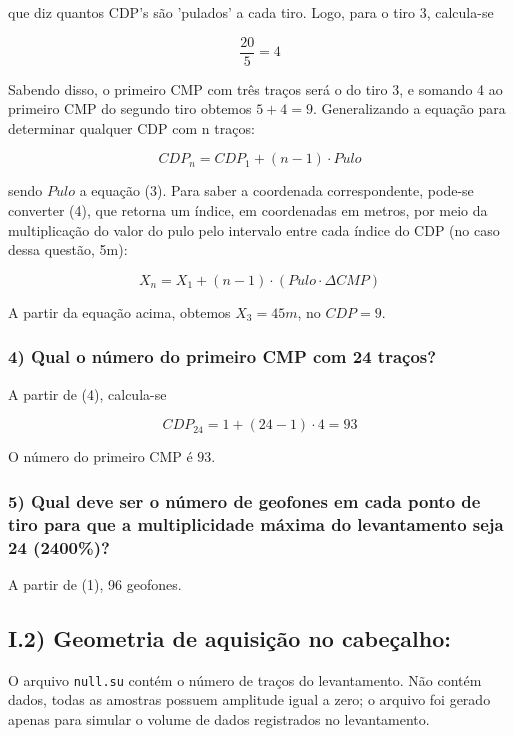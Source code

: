 \documentclass[12pt,a4paper]{article}
\begin{document}
\noindent
que diz quantos CDP's são 'pulados' a cada tiro. Logo, para o tiro 3, calcula-se

$$ \frac{20}{5} = 4$$

Sabendo disso, o primeiro CMP com três traços será o do tiro 3, e somando 4 ao primeiro CMP do segundo tiro obtemos $5 + 4 = 9$. Generalizando a equação para determinar qualquer CDP com n traços:

\begin{equation}
    CDP_n = CDP_1 + (n-1) \cdot Pulo
\end{equation}

\noindent
sendo $Pulo$ a equação (3). Para saber a coordenada correspondente, pode-se converter (4), que retorna um índice, em coordenadas em metros, por meio da multiplicação do valor do pulo pelo intervalo entre cada índice do CDP (no caso dessa questão, 5m):

\begin{equation}
    X_n = X_1 + (n-1) \cdot(Pulo \cdot \Delta CMP)
\end{equation}

A partir da equação acima, obtemos $X_3 = 45m$, no $CDP = 9$.



\subsubsection{4) Qual o número do primeiro CMP com 24 traços?}

A partir de (4), calcula-se

$$ CDP_{24} = 1 + (24-1) \cdot 4 = 93$$

O número do primeiro CMP é $93$. 


\subsubsection{5) Qual deve ser o número de geofones em cada ponto de tiro para que a multiplicidade máxima do levantamento seja 24 (2400\%)?}

A partir de (1), 96 geofones. 



\subsection{I.2) Geometria de aquisição no cabeçalho:}

O arquivo \texttt{null.su} contém o número de traços do levantamento. Não contém dados, todas as amostras possuem amplitude igual a zero; o arquivo foi gerado apenas para simular o volume de dados registrados no levantamento.
\end{document}
